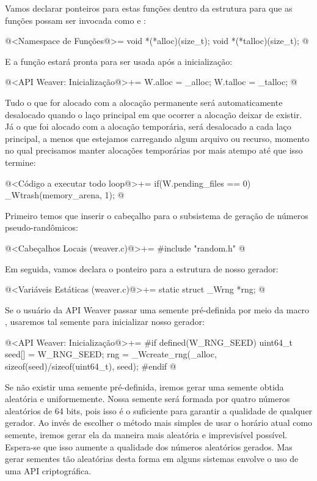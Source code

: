 Vamos declarar ponteiros para estas funções dentro da
estrutura  para que as funções possam ser invocada
como  e :

\iniciocodigo
@<Namespace de Funções@>=
void *(*alloc)(size_t);
void *(*talloc)(size_t);
@
\fimcodigo

E a função estará pronta para ser usada após a inicialização:

\iniciocodigo
@<API Weaver: Inicialização@>+=
W.alloc = _alloc;
W.talloc = _talloc;
@
\fimcodigo

Tudo o que for alocado com a alocação permanente será automaticamente
desalocado quando o laço principal em que ocorrer a alocação deixar de
existir. Já o que foi alocado com a alocação temporária, será
desalocado a cada laço principal, a menos que estejamos carregando
algum arquivo ou recurso, momento no qual precisamos manter alocações
temporárias por mais atempo até que isso termine:

\iniciocodigo
@<Código a executar todo loop@>+=
if(W.pending_files == 0)
  _Wtrash(memory_arena, 1);
@
\fimcodigo


Primeiro temos que inserir o cabeçalho para o subsistema de geração de
números pseudo-randômicos:

\iniciocodigo
@<Cabeçalhos Locais (weaver.c)@>+=
#include "random.h"
@
\fimcodigo

Em seguida, vamos declara o ponteiro para a estrutura de nosso
gerador:

\iniciocodigo
@<Variáveis Estáticas (weaver.c)@>+=
static struct _Wrng *rng;
@
\fimcodigo

Se o usuário da API Weaver passar uma semente pré-definida por meio da
macro , usaremos tal semente para inicializar
nosso gerador:

\iniciocodigo
@<API Weaver: Inicialização@>+=
#if defined(W_RNG_SEED)
{
  uint64_t seed[] = W_RNG_SEED;
  rng = _Wcreate_rng(_alloc, sizeof(seed)/sizeof(uint64_t), seed);
}
#endif
@
\fimcodigo

Se não existir uma semente pré-definida, iremos gerar uma semente
obtida aleatória e uniformemente. Nossa semente será formada por
quatro números aleatórios de 64 bits, pois isso é o suficiente para
garantir a qualidade de qualquer gerador. Ao invés de escolher o
método mais simples de usar o horário atual como semente, iremos gerar
ela da maneira mais aleatória e imprevisível possível. Espera-se que
isso aumente a qualidade dos números aleatórios gerados. Mas gerar
sementes tão aleatórias desta forma em alguns sistemas envolve o uso
de uma API criptográfica.

